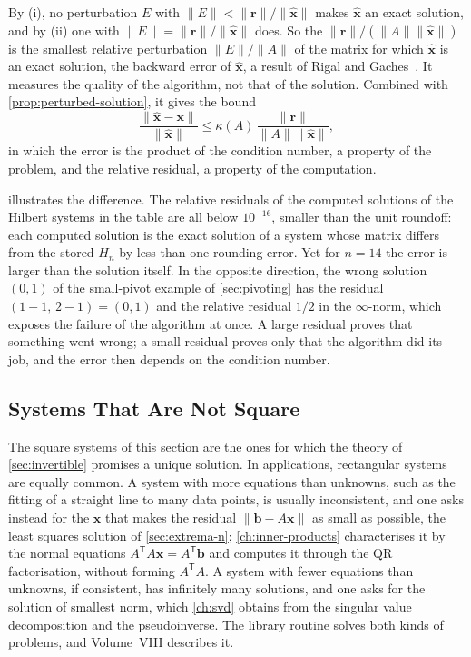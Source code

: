 By (i), no perturbation $E$ with $\|E\|<\|\mathbf r\|/\|\hat{\mathbf x}\|$ makes $\hat{\mathbf x}$ an exact solution, and by (ii) one with $\|E\|=\|\mathbf r\|/\|\hat{\mathbf x}\|$ does. So the  $\|\mathbf r\|/(\|A\|\|\hat{\mathbf x}\|)$ is the smallest relative perturbation $\|E\|/\|A\|$ of the matrix for which $\hat{\mathbf x}$ is an exact solution, the backward error of $\hat{\mathbf x}$, a result of Rigal and Gaches~\cite{rigal1967}. It measures the quality of the algorithm, not that of the solution. Combined with \cref{prop:perturbed-solution}, it gives the bound
\[
\frac{\|\hat{\mathbf x}-\mathbf x\|}{\|\hat{\mathbf x}\|}\le\kappa(A)\,\frac{\|\mathbf r\|}{\|A\|\|\hat{\mathbf x}\|},
\]
in which the error is the product of the condition number, a property of the problem, and the relative residual, a property of the computation.

 illustrates the difference. The relative residuals of the computed solutions of the Hilbert systems in the table are all below $10^{-16}$, smaller than the unit roundoff: each computed solution is the exact solution of a system whose matrix differs from the stored $H_n$ by less than one rounding error. Yet for $n=14$ the error is larger than the solution itself. In the opposite direction, the wrong solution $(0,1)$ of the small-pivot example of \cref{sec:pivoting} has the residual $(1-1,\,2-1)=(0,1)$ and the relative residual $1/2$ in the $\infty$-norm, which exposes the failure of the algorithm at once. A large residual proves that something went wrong; a small residual proves only that the algorithm did its job, and the error then depends on the condition number.

\subsection{Systems That Are Not Square}

The square systems of this section are the ones for which the theory of \cref{sec:invertible} promises a unique solution. In applications, rectangular systems are equally common. A system with more equations than unknowns, such as the fitting of a straight line to many data points, is usually inconsistent, and one asks instead for the $\mathbf x$ that makes the residual $\|\mathbf b-A\mathbf x\|$ as small as possible, the least squares solution of \cref{sec:extrema-n}; \cref{ch:inner-products} characterises it by the normal equations $A^{\mathsf T}A\mathbf x=A^{\mathsf T}\mathbf b$ and computes it through the QR factorisation, without forming $A^{\mathsf T}A$. A system with fewer equations than unknowns, if consistent, has infinitely many solutions, and one asks for the solution of smallest norm, which \cref{ch:svd} obtains from the singular value decomposition and the pseudoinverse. The library routine  solves both kinds of problems, and Volume~VIII describes it.


